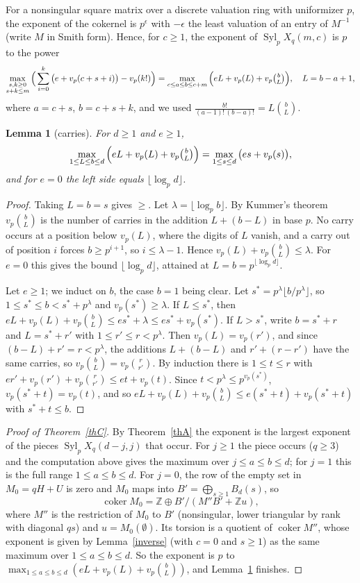 \documentclass[10pt]{article}
\theoremstyle{ds}
\newtheorem{lemma}{Lemma}
\theoremstyle{dsrem}
\newcommand{\Z}{\mathbb{Z}}
\newcommand{\Syl}{\operatorname{Syl}}
\newcommand{\coker}{\operatorname{coker}}
\begin{document}
For a nonsingular square matrix over a discrete valuation ring with uniformizer $p$, the exponent of the cokernel is $p^{\epsilon}$ with $-\epsilon$ the least valuation of an entry of $M^{-1}$ (write $M$ in Smith form). Hence, for $c\ge1$, the exponent of $\Syl_pX_q(m,c)$ is $p$ to the power
\[
\max_{\substack{s,k\ge0\\ s+k\le m}}\Big(\sum_{i=0}^{k}\big(e+v_p(c+s+i)\big)-v_p(k!)\Big)
=\max_{c\le a\le b\le c+m}\Big(eL+v_p(L)+v_p\tbinom bL\Big),\quad L=b-a+1,
\]
where $a=c+s$, $b=c+s+k$, and we used $\frac{b!}{(a-1)!\,(b-a)!}=L\binom bL$.

\begin{lemma}[carries]\label{carries}
For $d\ge1$ and $e\ge1$,
\[
\max_{1\le L\le b\le d}\Big(eL+v_p(L)+v_p\tbinom bL\Big)=\max_{1\le s\le d}\big(es+v_p(s)\big),
\]
and for $e=0$ the left side equals $\lfloor\log_p d\rfloor$.
\end{lemma}

\begin{proof}
Taking $L=b=s$ gives $\ge$. Let $\lambda=\lfloor\log_pb\rfloor$. By Kummer's theorem $v_p\binom bL$ is the number of carries in the addition $L+(b-L)$ in base $p$. No carry occurs at a position below $v_p(L)$, where the digits of $L$ vanish, and a carry out of position $i$ forces $b\ge p^{i+1}$, so $i\le\lambda-1$. Hence $v_p(L)+v_p\binom bL\le\lambda$. For $e=0$ this gives the bound $\lfloor\log_pd\rfloor$, attained at $L=b=p^{\lfloor\log_pd\rfloor}$.

Let $e\ge1$; we induct on $b$, the case $b=1$ being clear. Let $s^*=p^\lambda\lfloor b/p^\lambda\rfloor$, so $1\le s^*\le b<s^*+p^\lambda$ and $v_p(s^*)\ge\lambda$. If $L\le s^*$, then $eL+v_p(L)+v_p\binom bL\le es^*+\lambda\le es^*+v_p(s^*)$. If $L>s^*$, write $b=s^*+r$ and $L=s^*+r'$ with $1\le r'\le r<p^\lambda$. Then $v_p(L)=v_p(r')$, and since $(b-L)+r'=r<p^\lambda$, the additions $L+(b-L)$ and $r'+(r-r')$ have the same carries, so $v_p\binom bL=v_p\binom r{r'}$. By induction there is $1\le t\le r$ with $er'+v_p(r')+v_p\binom r{r'}\le et+v_p(t)$. Since $t<p^\lambda\le p^{v_p(s^*)}$, $v_p(s^*+t)=v_p(t)$, and so $eL+v_p(L)+v_p\binom bL\le e(s^*+t)+v_p(s^*+t)$ with $s^*+t\le b$.
\end{proof}

\begin{proof}[Proof of Theorem~\ref{thC}]
By Theorem~\ref{thA} the exponent is the largest exponent of the pieces $\Syl_pX_q(d-j,j)$ that occur. For $j\ge1$ the piece occurs ($q\ge3$) and the computation above gives the maximum over $j\le a\le b\le d$; for $j=1$ this is the full range $1\le a\le b\le d$. For $j=0$, the row of the empty set in $M_0=qH+U$ is zero and $M_0$ maps into $B'=\bigoplus_{s\ge1}B_d(s)$, so
\[\coker M_0=\Z\oplus B'/(M''B'+\Z u),\]
where $M''$ is the restriction of $M_0$ to $B'$ (nonsingular, lower triangular by rank with diagonal $qs$) and $u=M_0(\emptyset)$. Its torsion is a quotient of $\coker M''$, whose exponent is given by Lemma~\ref{inverse} (with $c=0$ and $s\ge1$) as the same maximum over $1\le a\le b\le d$. So the exponent is $p$ to $\max_{1\le a\le b\le d}(eL+v_p(L)+v_p\binom bL)$, and Lemma~\ref{carries} finishes.
\end{proof}
\end{document}
